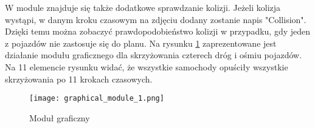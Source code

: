 \newline
W module znajduje się także dodatkowe sprawdzanie kolizji. Jeżeli kolizja wystąpi, w danym kroku czasowym na zdjęciu dodany zostanie napis "Collision". Dzięki temu można zobaczyć prawdopodobieństwo kolizji w przypadku, gdy jeden z pojazdów nie zastosuje się do planu.
\newline
\newline
Na rysunku \ref{graphical-framework} zaprezentowane jest działanie modułu graficznego dla skrzyżowania czterech dróg i ośmiu pojazdów. Na 11 elemencie rysunku widać, że wszystkie samochody opuściły wszystkie skrzyżowania po 11 krokach czasowych.
\begin{figure}
    \texttt{[image: graphical\_module\_1.png]}
  \caption{Moduł graficzny}
  \label{graphical-framework}
\end{figure}
\newpage
